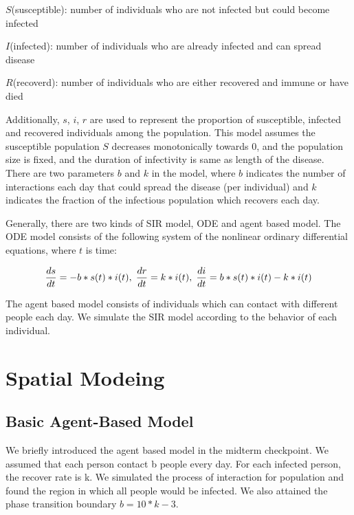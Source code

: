 \documentclass{article}
\begin{document}
$S$(susceptible): number of individuals who are not infected but could become infected

$I$(infected): number of individuals who are already infected and can spread disease

$R$(recoverd): number of individuals who are either recovered and immune or have died

Additionally, $s$, $i$, $r$ are used to represent the proportion of susceptible, infected and recovered individuals among the population. This model assumes the susceptible population $S$ decreases monotonically towards 0, and the population size is fixed, and the duration of infectivity is same as length of the disease. There are two parameters $b$ and $k$ in the model, where $b$ indicates the number of interactions each day that could spread the disease (per individual) and $k$ indicates the fraction of the infectious population which recovers each day.

Generally, there are two kinds of SIR model, ODE and agent based model. The ODE model consists of the following system of the nonlinear ordinary differential equations, where $t$ is time:

$$\frac{ds}{dt} = -b * s(t) * i(t), \hspace{0.1cm}
\frac{dr}{dt} = k * i(t), \hspace{0.1cm}
\frac{di}{dt} = b * s(t) * i(t) - k * i(t)$$


The agent based model consists of individuals which can contact with different people each day. We simulate the SIR model according to the behavior of each individual.





\section{Spatial Modeing}

\subsection{Basic Agent-Based Model}

We briefly introduced the agent based model in the midterm checkpoint. We assumed that each person contact b people every day. For each infected person, the recover rate is k. We simulated the process of interaction for population and found the region in which all people would be infected. We also attained the phase transition boundary $b = 10*k - 3$.
\end{document}
